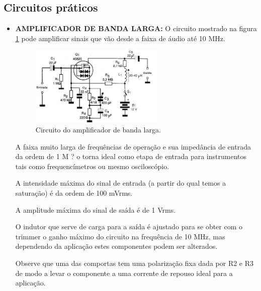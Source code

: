 \documentclass[12pt]{article}
\begin{document}
        \subsection{Circuitos práticos}

            \begin{itemize}

                \item \textbf{AMPLIFICADOR DE BANDA LARGA:} O circuito mostrado na figura \ref{fig:amplificador} pode amplificar sinais que vão desde a faixa de áudio até 10 MHz\cite{newtoncbraga_mosfet_2025}.

                    \begin{figure}[htpb!]

                        \centering
                        \includegraphics[width=0.6\textwidth]{./images/Amplificador banda larga.jpg}
                        \caption{Circuito do amplificador de banda larga.}
                        \label{fig:amplificador}

                    \end{figure}
                A faixa muito larga de frequências de operação e sua impedância de entrada da ordem de 1 M ? o torna ideal como etapa de entrada para instrumentos tais como frequencímetros ou mesmo osciloscópio.

                A intensidade máxima do sinal de entrada (a partir do qual temos a saturação) é da ordem de 100 mVrms.

                A amplitude máxima do sinal de saída é de 1 Vrms.

                O indutor que serve de carga para a saída é ajustado para se obter com o trimmer o ganho máximo do circuito na frequência de 10 MHz, mas dependendo da aplicação estes componentes podem ser alterados.

                Observe que uma das comportas tem uma polarização fixa dada por R2 e R3 de modo a levar o componente a uma corrente de repouso ideal para a aplicação.


\end{itemize}
\end{document}
